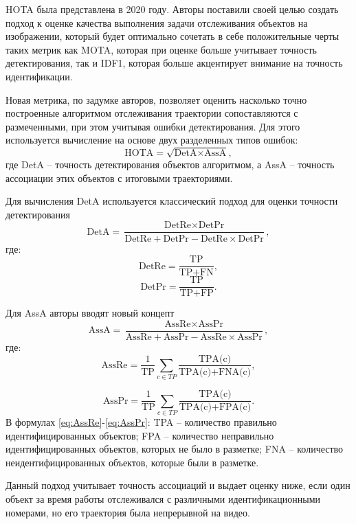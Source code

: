 HOTA \cite{luiten2021hota} была представлена в 2020 году. Авторы поставили своей целью создать подход к оценке качества выполнения задачи отслеживания объектов на изображении, который будет оптимально сочетать в себе положительные черты таких метрик как MOTA, которая при оценке больше учитывает точность детектирования, так и IDF1, которая больше акцентирует внимание на точность идентификации.

Новая метрика, по задумке авторов, позволяет оценить насколько точно построенные алгоритмом отслеживания траектории сопоставляются с размеченными, при этом учитывая ошибки детектирования. Для этого используется вычисление на основе двух разделенных типов ошибок:
\begin{equation}
    \label{eq:hota}
    \text{HOTA} = \sqrt{\text{DetA} \times \text{AssA}},
\end{equation}
где DetA -- точность детектирования объектов алгоритмом, а AssA -- точность ассоциации этих объектов с итоговыми траекториями. 

Для вычисления DetA используется классический подход для оценки точности детектирования
\begin{equation}
    \label{eq:detA}
    \text{DetA} = \frac{\text{DetRe} \times \text{DetPr}}{\text{DetRe} + \text{DetPr} - \text{DetRe} \times \text{DetPr}},
\end{equation}
где:
\begin{equation}
    \label{eq:detRe}
    \text{DetRe} = \frac{\text{TP}}{\text{TP} + \text{FN}},
\end{equation}
\begin{equation}
    \label{eq:detPr}
    \text{DetPr} = \frac{\text{TP}}{\text{TP} + \text{FP}}.
\end{equation}

Для AssA авторы вводят новый концепт
\begin{equation}
    \label{eq:AssA}
    \text{AssA} = \frac{\text{AssRe} \times \text{AssPr}}{\text{AssRe} + \text{AssPr} - \text{AssRe} \times \text{AssPr}},
\end{equation}
где: 
\begin{equation}
    \label{eq:AssRe}
    \text{AssRe} = \frac{1}{\text{TP}} \sum_{c \in {TP}} \frac{\text{TPA(c)}}{\text{TPA(c)} + \text{FNA(c)}},
\end{equation}

\begin{equation}
    \label{eq:AssPr}
    \text{AssPr} = \frac{1}{\text{TP}} \sum_{c \in {TP}} \frac{\text{TPA(c)}}{\text{TPA(c)} + \text{FPA(c)}}.
\end{equation}
В формулах \ref{eq:AssRe}-\ref{eq:AssPr}: TPA -- количество правильно идентифицированных объектов; FPA -- количество неправильно идентифицированных объектов, которых не было в разметке; FNA -- количество неидентифицированных объектов, которые были в разметке.

Данный подход учитывает точность ассоциаций и выдает оценку ниже, если один объект за время работы отслеживался с различными идентификационными номерами, но его траектория была непрерывной на видео.